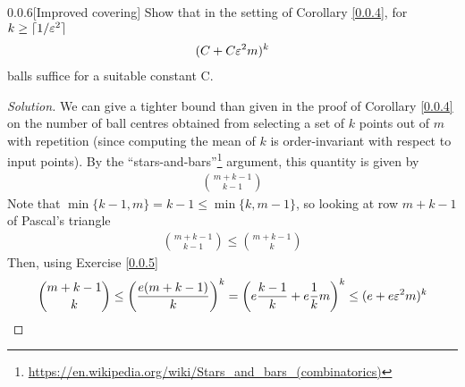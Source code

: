 \begin{ex}{0.0.6}[Improved covering]\label{0.0.6}
Show that in the setting of Corollary \ref{0.0.4}, for $k \geq \lceil 1/\varepsilon^2 \rceil$
\begin{align*}
    (C + C\varepsilon^2m)^k
\end{align*}
balls suffice for a suitable constant C.
\end{ex}

\begin{proof}[Solution] 
We can give a tighter bound than given in the proof of Corollary \ref{0.0.4} on the number of ball centres obtained from selecting a set of $k$ points out of $m$ with repetition
(since computing the mean of $k$ is order-invariant with respect to input points). By the ``stars-and-bars''\footnote{\url{https://en.wikipedia.org/wiki/Stars_and_bars_(combinatorics)}} argument, this quantity is given by
\begin{align*}
    \binom{m+k-1}{k -1}
\end{align*}
Note that $\min\{k-1, m\} = k - 1\leq \min\{k, m-1\}$, so looking at row $m+k-1$ of Pascal's triangle
\begin{align*}
    \binom{m+k-1} {k -1} \leq \binom{m+k-1}{k}
\end{align*}
Then, using Exercise \ref{0.0.5}
\begin{align*}
    \binom{m+k-1}{k} \leq \left(\frac {e (m+k-1)}{k}\right)^k = \left(e\frac{k-1}{k} + e\frac1k m\right)^k \leq (e + e\varepsilon^2m)^k
\end{align*}

\end{proof}
